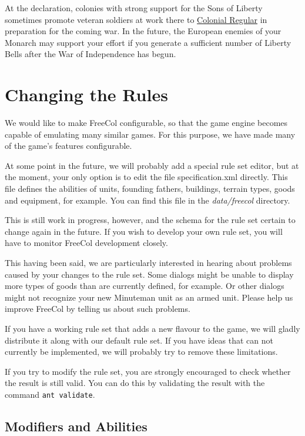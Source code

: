 \documentclass[12pt]{book}
\begin{document}
At the declaration, colonies with strong support for the Sons of
Liberty sometimes promote veteran soldiers at work there to
\hyperlink{Colonial Regular}{Colonial Regular} in preparation for the
coming war.  In the future, the European enemies of your Monarch may
support your effort if you generate a sufficient number of Liberty
Bells after the War of Independence has begun.


\hypertarget{Changing the Rules}{\chapter{Changing the Rules}}

We would like to make FreeCol configurable, so that the game engine
becomes capable of emulating many similar games. For this purpose,
we have made many of the game's features configurable.

At some point in the future, we will probably add a special rule set
editor, but at the moment, your only option is to edit the file
specification.xml directly. This file defines the abilities of units,
founding fathers, buildings, terrain types, goods and equipment, for
example. You can find this file in the \textit{data/freecol} directory.

This is still work in progress, however, and the schema for the rule
set certain to change again in the future. If you wish to develop your
own rule set, you will have to monitor FreeCol development closely.

This having been said, we are particularly interested in hearing about
problems caused by your changes to the rule set. Some dialogs might be
unable to display more types of goods than are currently defined, for
example. Or other dialogs might not recognize your new Minuteman unit
as an armed unit. Please help us improve FreeCol by telling us about
such problems.

If you have a working rule set that adds a new flavour to the game, we
will gladly distribute it along with our default rule set. If you have
ideas that can not currently be implemented, we will probably try to
remove these limitations.

If you try to modify the rule set, you are strongly encouraged to
check whether the result is still valid. You can do this by validating
the result with the command \verb$ant validate$.


\hypertarget{Modifiers and Abilities}{\section{Modifiers and Abilities}}
\end{document}
